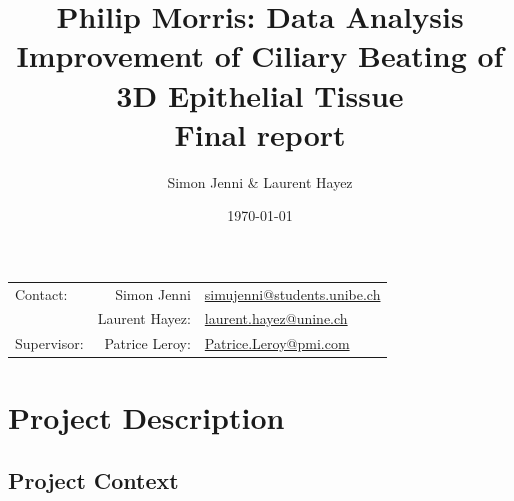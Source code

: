 \documentclass[11pt]{scrartcl}
\title{Philip Morris: Data Analysis Improvement of Ciliary Beating of 3D Epithelial Tissue\\\vspace{1cm}Final report\vspace{1cm}} %
\author{Simon Jenni \& Laurent Hayez} %
\date{\today} %
\begin{document}

\setfootsepline[text]{.4pt}

\pagestyle{scrheadings}
\ohead{}
\chead{}
\ofoot[\pagemark]{\pagemark}
\cfoot[]{}

\maketitle %

\thispagestyle{empty}

\begin{center}
\begin{tabular}{l r !{\textendash} l}
Contact: & Simon Jenni & \href{mailto:simujenni@students.unibe.ch}{simujenni@students.unibe.ch} \\ %
& Laurent Hayez: & \href{mailto:laurent.hayez@unine.ch}{laurent.hayez@unine.ch}\\
Supervisor: & Patrice Leroy: & \href{mailto:Patrice.Leroy@pmi.com)}{Patrice.Leroy@pmi.com} %
\end{tabular}
\end{center}


\vspace{1cm}
\renewcommand{\contentsname}{Table of contents}
\tableofcontents




\section{Project Description}

\subsection{Project Context}
\end{document}
